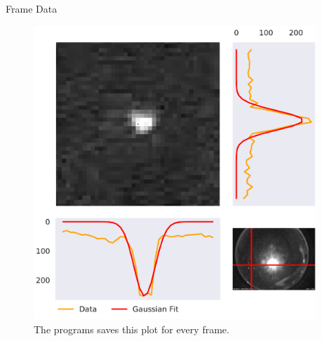 \documentclass[final]{beamer}
\newlength{\sepwid}
\newlength{\onecolwid}
\begin{document}
\begin{frame}[t]
\begin{columns}[t]
\begin{column}{\onecolwid}
\begin{alertblock}{Frame Data}
\begin{figure}
\includegraphics[width=0.8\linewidth]{testplot1.pdf}
\caption{The programs saves this plot for every frame.}
\end{figure}

\end{alertblock}

\end{column} %
\begin{column}{\sepwid}\end{column} %







\end{columns}
\end{frame}
\end{document}
